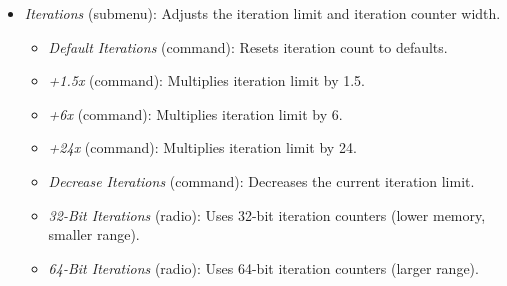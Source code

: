 \begin{itemize}
\begin{itemize}
      \item \emph{Tests} (submenu): Development and diagnostic test actions.
        \begin{itemize}
          \item \emph{Run Basic Test (saves files in local dir)} (command)
          \item \emph{Run View \#27 test} (command)
        \end{itemize}

    \end{itemize}

  \item \emph{Iterations} (submenu): Adjusts the iteration limit and iteration counter width.
    \begin{itemize}
      \item \emph{Default Iterations} (command): Resets iteration count to defaults.
      \item \emph{+1.5x} (command): Multiplies iteration limit by 1.5.
      \item \emph{+6x} (command): Multiplies iteration limit by 6.
      \item \emph{+24x} (command): Multiplies iteration limit by 24.
      \item \emph{Decrease Iterations} (command): Decreases the current iteration limit.
      \item \emph{32-Bit Iterations} (radio): Uses 32-bit iteration counters (lower memory, smaller range).
      \item \emph{64-Bit Iterations} (radio): Uses 64-bit iteration counters (larger range).
    \end{itemize}


\end{itemize}
